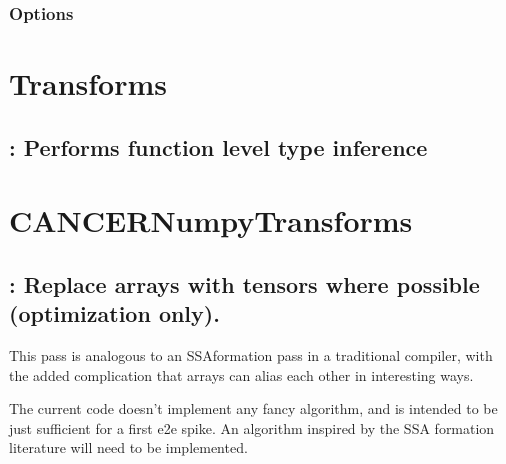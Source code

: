 \documentclass[letterpaper,10pt,english]{sphinxmanual}
\begin{document}
\subsubsection{Options}
\label{\detokenize{Pass_And_Transforms/index:options}}
\begin{sphinxVerbatim}[commandchars=\\\{\}]
      
\end{sphinxVerbatim}


\section{Transforms}
\label{\detokenize{Pass_And_Transforms/index:transforms}}



\subsection{: Performs function level type inference}
\label{\detokenize{Pass_And_Transforms/index:basicpy-type-inference-performs-function-level-type-inference}}

\section{CANCERNumpyTransforms}
\label{\detokenize{Pass_And_Transforms/index:cancernumpytransforms}}



\subsection{: Replace arrays with tensors where possible (optimization only).}
\label{\detokenize{Pass_And_Transforms/index:numpy-array-to-tensor-replace-arrays-with-tensors-where-possible-optimization-only}}
\sphinxAtStartPar
This pass is analogous to an SSA\sphinxhyphen{}formation pass in a traditional
compiler, with the added complication that arrays can alias each other
in interesting ways.

\sphinxAtStartPar
The current code doesn’t implement any fancy algorithm, and is intended
to be just sufficient for a first e2e spike. An algorithm inspired by
the SSA formation literature will need to be implemented.
\end{document}
